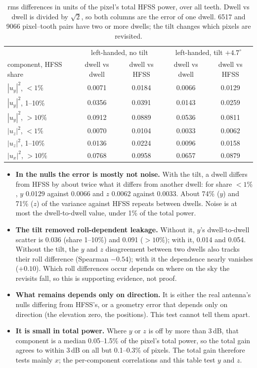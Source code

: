 \documentclass{aastex631}
\begin{document}
\begin{table}[h]
\centering
\caption{rms differences in units of the pixel's total HFSS power, over all teeth. Dwell vs dwell is divided by
  $\sqrt2$, so both columns are the error of one dwell. 6517 and 9066 pixel--tooth pairs have two or more dwells;
  the tilt changes which pixels are revisited.}
\label{tab:repeat}
\begin{tabular}{lcccc}
\hline
 & \multicolumn{2}{c}{left-handed, no tilt} & \multicolumn{2}{c}{left-handed, tilt $+4.7^\circ$} \\
component, HFSS share & dwell vs dwell & dwell vs HFSS & dwell vs dwell & dwell vs HFSS \\
\hline
$|u_y|^2$, $<1\%$    & 0.0071 & 0.0184 & 0.0066 & 0.0129 \\
$|u_y|^2$, 1--10\%   & 0.0356 & 0.0391 & 0.0143 & 0.0259 \\
$|u_y|^2$, $>10\%$   & 0.0912 & 0.0889 & 0.0536 & 0.0811 \\
$|u_z|^2$, $<1\%$    & 0.0070 & 0.0104 & 0.0033 & 0.0062 \\
$|u_z|^2$, 1--10\%   & 0.0136 & 0.0224 & 0.0096 & 0.0158 \\
$|u_x|^2$, $>10\%$   & 0.0768 & 0.0958 & 0.0657 & 0.0879 \\
\hline
\end{tabular}
\end{table}

\begin{itemize}
\item \textbf{In the nulls the error is mostly not noise.} With the tilt, a dwell differs from HFSS by about
  twice what it differs from another dwell: for share $<1\%$, $y$ 0.0129 against 0.0066 and $z$ 0.0062 against
  0.0033. About 74\% ($y$) and 71\% ($z$) of the variance against HFSS repeats between dwells. Noise is at most
  the dwell-to-dwell value, under 1\% of the total power.
\item \textbf{The tilt removed roll-dependent leakage.} Without it, $y$'s dwell-to-dwell scatter is 0.036 (share
  1--10\%) and 0.091 ($>10\%$); with it, 0.014 and 0.054. Without the tilt, the $y$ and $z$ disagreement between
  two dwells also tracks their roll difference (Spearman $-0.54$); with it the dependence nearly vanishes
  ($+0.10$). Which roll differences occur depends on where on the sky the revisits fall, so this is supporting
  evidence, not proof.
\item \textbf{What remains depends only on direction.} It is either the real antenna's nulls differing from
  HFSS's, or a geometry error that depends only on direction (the elevation zero, the positions). This test
  cannot tell them apart.
\item \textbf{It is small in total power.} Where $y$ or $z$ is off by more than 3\,dB, that component is a
  median 0.05--1.5\% of the pixel's total power, so the total gain agrees to within 3\,dB on all but 0.1--0.3\%
  of pixels. The total gain therefore tests mainly $x$; the per-component correlations and this table test $y$
  and $z$.
\end{itemize}
\end{document}
